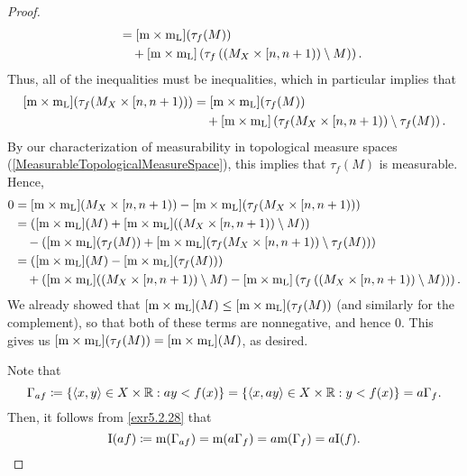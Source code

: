 \begin{thm}[Integral]
\begin{proof}
\begin{equation}
\begin{split}
& & & =[\mathrm{m} \times \mathrm{m} _{\mathrm{L}}](\tau _f(M)) \\
& & & \quad +[\mathrm{m} \times \mathrm{m} _{\mathrm{L}}]\left( \tau _f\left( (M_X\times [n,n+1))\setminus M\right) \right) .
\end{split}
\end{equation}
Thus, all of the inequalities must be inequalities, which in particular implies that
\begin{equation}
\begin{split}
[\mathrm{m} \times \mathrm{m} _{\mathrm{L}}](\tau _f(M_X\times [n,n+1))) & =[\mathrm{m} \times \mathrm{m} _{\mathrm{L}}](\tau _f(M)) \\
& \quad +[\mathrm{m} \times \mathrm{m} _{\mathrm{L}}]\left( \tau _f(M_X\times [n,n+1))\setminus \tau _f(M)\right) .
\end{split}
\end{equation}
By our characterization of measurability in topological measure spaces (\cref{MeasurableTopologicalMeasureSpace}), this implies that $\tau _f(M)$ is measurable.  Hence,
\begin{equation}
\begin{split}
0 & =[\mathrm{m} \times \mathrm{m} _{\mathrm{L}}](M_X\times [n,n+1))-[\mathrm{m} \times \mathrm{m} _{\mathrm{L}}](\tau _f(M_X\times [n,n+1))) \\
& =\left( [\mathrm{m} \times \mathrm{m} _{\mathrm{L}}](M)+[\mathrm{m} \times \mathrm{m} _{\mathrm{L}}]((M_X\times [n,n+1))\setminus M)\right) \\
& \quad -\left( [\mathrm{m} \times \mathrm{m} _{\mathrm{L}}](\tau _f(M))+[\mathrm{m} \times \mathrm{m} _{\mathrm{L}}](\tau _f(M_X\times [n,n+1))\setminus \tau _f(M))\right) \\
& =\left( [\mathrm{m} \times \mathrm{m} _{\mathrm{L}}](M)-[\mathrm{m} \times \mathrm{m} _{\mathrm{L}}](\tau _f(M))\right) \\
& \quad +\left( [\mathrm{m} \times \mathrm{m} _{\mathrm{L}}]((M_X\times [n,n+1))\setminus M)-[\mathrm{m} \times \mathrm{m} _{\mathrm{L}}]\left( \tau _f\left( (M_X\times [n,n+1))\setminus M\right) \right) \right) .
\end{split}
\end{equation}
We already showed that $[\mathrm{m} \times \mathrm{m} _{\mathrm{L}}](M)\leq [\mathrm{m} \times \mathrm{m} _{\mathrm{L}}](\tau _f(M))$ (and similarly for the complement), so that both of these terms are nonnegative, and hence $0$.  This gives us $[\mathrm{m} \times \mathrm{m} _{\mathrm{L}}](\tau _f(M))=[\mathrm{m} \times \mathrm{m} _{\mathrm{L}}](M)$, as desired.

Note that
\begin{equation}
\Gamma _{af}\coloneqq \left\{ \langle x,y\rangle\in X\times \mathbb{R} :ay<f(x)\right\} =\left\{ \langle x,ay\rangle\in X\times \mathbb{R} :y<f(x)\right\} =a\Gamma _f.
\end{equation}
Then, it follows from \cref{exr5.2.28} that
\begin{equation}
\mathrm{I}(af)\coloneqq \mathrm{m} (\Gamma _{af})=\mathrm{m} (a\Gamma _f)=a\mathrm{m} (\Gamma _f)=a\mathrm{I}(f).
\end{equation}


\end{proof}
\end{thm}
